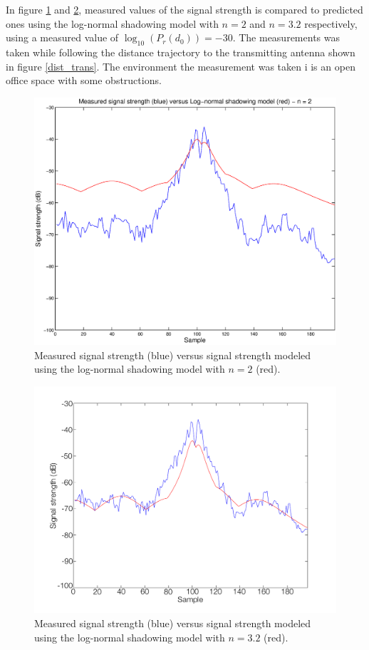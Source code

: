 \documentclass{LTHthesis}
\begin{document}
In figure \ref{log_norm_n_2} and \ref{log_norm_n_3_2}, measured values of the signal strength is compared to predicted ones using the log-normal shadowing model with $n=2$ and $n=3.2$ respectively, using a measured value of $\log_{10}({P_r(d_0)})= -30$. The measurements was taken while following the distance trajectory to the transmitting antenna shown in figure \ref{dist_trans}. The environment the measurement was taken i is an open office space with some obstructions.
%
\begin{figure}[!hbt]

\includegraphics[width=1\textwidth]{images/signal_model/log_norm_n_2.eps}
\caption{Measured signal strength (blue) versus signal strength modeled using the log-normal shadowing model with $n=2$ (red).}\label{log_norm_n_2}
\end{figure}
%
\begin{figure}[!hbt]

\includegraphics[width=1\textwidth ]{images/signal_model/log_norm_n_3_2}
\caption{Measured signal strength (blue) versus signal strength modeled using the log-normal shadowing model with $n=3.2$ (red).}\label{log_norm_n_3_2}
\end{figure}
\end{document}
